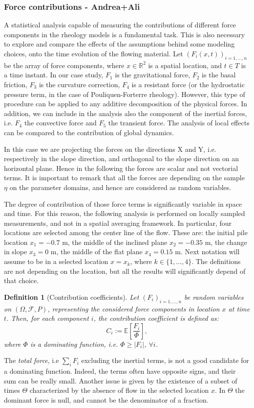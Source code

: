 \documentclass{article}
\newtheorem{definition}[theorem]{Definition}
\begin{document}
\subsubsection{Force contributions - Andrea+Ali}
A statistical analysis capable of measuring the contributions of different force components in the rheology models is a fundamental task. This is also necessary to explore and compare the effects of the assumptions behind some modeling choices, onto the time evolution of the flowing material. Let $(F_i(x,t))_{i=1,\dots, n}$ be the array of force components, where $x\in\mathbb R^2$ is a spatial location, and $t\in T$ is a time instant. In our case study, $F_1$ is the gravitational force, $F_2$ is the basal friction, $F_3$ is the curvature correction, $F_4$ is a resistant force (or the hydrostatic pressure term, in the case of Pouliquen-Forterre rheology). However, this type of procedure can be applied to any additive decomposition of the physical forces. In addition, we can include in the analysis also the component of the inertial forces, i.e. $F_4$ the convective force and $F_5$ the transient force. The analysis of local effects can be compared to the contribution of global dynamics.

In this case we are projecting the forces on the directions X and Y, i.e. respectively in the slope direction, and orthogonal to the slope direction on an horizontal plane. Hence in the following the forces are scalar and not vectorial terms. It is important to remark that all the forces are depending on the sample $\eta$ on the parameter domains, and hence are considered as random variables.

The degree of contribution of those force terms is significantly variable in space and time. For this reason, the following analysis is performed on locally sampled measurements, and not in a spatial averaging framework. In particular, four locations are selected among the center line of the flow. These are: the initial pile location $x_1=-0.7$ m, the middle of the inclined plane $x_2=-0.35$ m, the change in slope $x_3=0$ m, the middle of the flat plane $x_4=0.15$ m. Next notation will assume to be in a selected location $x=x_k$, where $k\in\{1,\dots, 4\}$. The definitions are not depending on the location, but all the results will significantly depend of that choice.

\begin{definition}[Contribution coefficients]
Let $(F_i)_{i=1,\dots, n}$ be random variables on $(\Omega, \mathcal F, P)$, representing the considered force components in location $x$ at time $t$. Then, for each component $i$, the contribution coefficient is defined as:
$$C_i:=\mathbb E\left[\frac{F_i}{\Phi}\right],$$
where $\Phi$ is a dominating function, i.e. $\Phi\ge |F_i|$, $\forall i$.
\end{definition}
The \emph{total force}, i.e $\sum_i F_i$ excluding the inertial terms, is not a good candidate for a dominating function. Indeed, the terms often have opposite signs, and their sum can be really small. Another issue is given by the existence of a subset of times $\Theta$ characterized by the absence of flow in the selected location $x$. In $\Theta$ the dominant force is null, and cannot be the denominator of a fraction.
\end{document}
